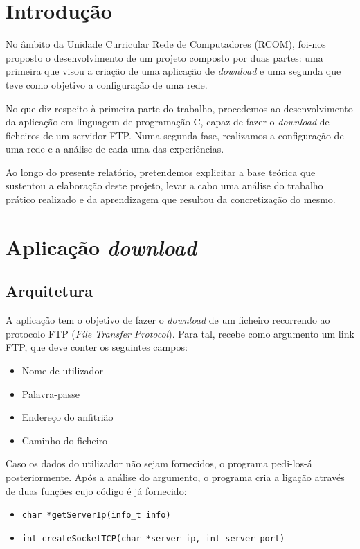 \documentclass{article}
\begin{document}
\tableofcontents
\clearpage
 
\section{Introdução}
No âmbito da Unidade Curricular Rede de Computadores (RCOM), foi-nos proposto o desenvolvimento de um projeto composto por duas partes: uma primeira que visou a criação de uma aplicação de \textit{download} e uma segunda que teve como objetivo a configuração de uma rede.  

No que diz respeito à primeira parte do trabalho, procedemos ao desenvolvimento da aplicação em linguagem de programação C, capaz de fazer o \textit{download} de ficheiros de um servidor FTP. Numa segunda fase, realizamos a configuração de uma rede e a análise de cada uma das experiências.  

Ao longo do presente relatório, pretendemos explicitar a base teórica que sustentou a elaboração deste projeto, levar a cabo uma análise do trabalho prático realizado e da aprendizagem que resultou da concretização do mesmo. 

\section{Aplicação \textit{download}}
\subsection{Arquitetura}

A aplicação tem o objetivo de fazer o \textit{download} de um ficheiro recorrendo ao protocolo
FTP (\textit{File Transfer Protocol}). Para tal, recebe como argumento um link FTP, que deve conter
os seguintes campos:

\begin{itemize}
\item Nome de utilizador
\item Palavra-passe
\item Endereço do anfitrião
\item Caminho do ficheiro
\end{itemize}

Caso os dados do utilizador não sejam fornecidos, o programa pedi-los-á posteriormente.
Após a análise do argumento, o programa cria a ligação através de duas funções cujo código 
é já fornecido:

\begin{itemize}
\item \texttt{char *getServerIp(info_t info)}
\item \texttt{int createSocketTCP(char *server_ip, int server_port)}
\end{itemize}
\end{document}
